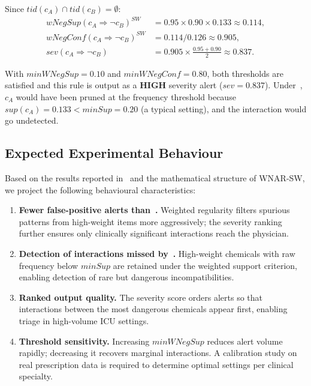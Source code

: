 \documentclass[10pt,twocolumn]{article}
\theoremstyle{plain}
\theoremstyle{definition}
\theoremstyle{remark}
\newcommand{\wNegSup}{\mathit{wNegSup}}
\newcommand{\wNegConf}{\mathit{wNegConf}}
\newcommand{\minSup}{\mathit{minSup}}
\newcommand{\SW}{\mathit{SW}}
\begin{document}
\noindent
Since $\mathit{tid}(c_A) \cap \mathit{tid}(c_B) = \emptyset$:
\begin{align*}
  \wNegSup(c_A \Rightarrow \lnot c_B)^{\SW}
    &= 0.95 \times 0.90 \times 0.133 \approx 0.114,\\
  \wNegConf(c_A \Rightarrow \lnot c_B)^{\SW}
    &= 0.114 / 0.126 \approx 0.905,\\
  \mathit{sev}(c_A \Rightarrow \lnot c_B)
    &= 0.905 \times \tfrac{0.95 + 0.90}{2} \approx 0.837.
\end{align*}

With $\mathit{minWNegSup} = 0.10$ and $\mathit{minWNegConf} = 0.80$,
both thresholds are satisfied and this rule is output as a
\textbf{HIGH} severity alert ($\mathit{sev} = 0.837$).
Under~\cite{sastry2025}, $c_A$ would have been pruned at the frequency
threshold because $\mathit{sup}(c_A) = 0.133 < \minSup = 0.20$
(a typical setting), and the interaction would go undetected.

\subsection{Expected Experimental Behaviour}

Based on the results reported in~\cite{sastry2025} and the
mathematical structure of WNAR-SW, we project the following
behavioural characteristics:

\begin{enumerate}[leftmargin=*, itemsep=3pt]

  \item \textbf{Fewer false-positive alerts than~\cite{sastry2025}.}
        Weighted regularity filters spurious patterns from high-weight
        items more aggressively; the severity ranking further ensures
        only clinically significant interactions reach the physician.

  \item \textbf{Detection of interactions missed by~\cite{sastry2025}.}
        High-weight chemicals with raw frequency below $\minSup$ are
        retained under the weighted support criterion, enabling
        detection of rare but dangerous incompatibilities.

  \item \textbf{Ranked output quality.}
        The severity score orders alerts so that interactions between
        the most dangerous chemicals appear first, enabling triage in
        high-volume ICU settings.

  \item \textbf{Threshold sensitivity.}
        Increasing $\mathit{minWNegSup}$ reduces alert volume rapidly;
        decreasing it recovers marginal interactions.
        A calibration study on real prescription data is required to
        determine optimal settings per clinical specialty.

\end{enumerate}
\end{document}
